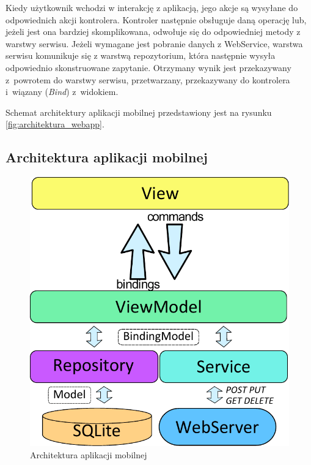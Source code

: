 \documentclass{book}
\begin{document}
			Kiedy użytkownik wchodzi w interakcję z aplikacją, jego akcje są wysyłane do odpowiednich akcji kontrolera. Kontroler następnie obsługuje daną operację lub, jeżeli jest ona bardziej skomplikowana, odwołuje się do odpowiedniej metody z warstwy serwisu. Jeżeli wymagane jest pobranie danych z WebService, warstwa serwisu komunikuje się z warstwą repozytorium, która następnie wysyła odpowiednio skonstruowane zapytanie. Otrzymany wynik jest przekazywany z~powrotem do warstwy serwisu, przetwarzany, przekazywany do kontrolera i~wiązany (\emph{Bind}) z~widokiem.								

			Schemat architektury aplikacji mobilnej przedstawiony jest na rysunku \ref{fig:architektura_webapp}.			
			
			\subsection{Architektura aplikacji mobilnej}
			\label{sec:ArchitekturaAplikacjiMobilnej}	
			
			\begin{figure}
				\centering
				\includegraphics[width=1\textwidth]{images/architektura_mobile.pdf}
				\caption{Architektura aplikacji mobilnej}
				\label{fig:architektura_mobile}
			\end{figure}
			
\end{document}
